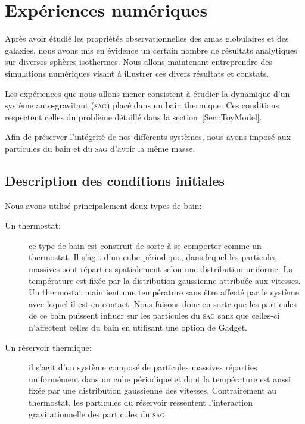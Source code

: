 \chapter{Expériences numériques}\label{Chap::Resultat}
	\minitoc

Après avoir étudié les propriétés observationnelles des amas globulaires et des galaxies, nous avons mis en évidence un certain nombre
de résultats analytiques sur diverses sphères isothermes. Nous allons maintenant entreprendre des simulations numériques visant
à illustrer ces divers résultats et constats.

Les expériences que nous allons mener consistent à étudier la dynamique d'un système auto-gravitant (\textsc{sag}) placé
dans un bain thermique. Ces conditions respectent celles du problème détaillé dans la section~\ref{Sec::ToyModel}.

Afin de préserver l'intégrité de nos différents systèmes, nous avons imposé aux particules du bain et du \textsc{sag} d'avoir la
même masse.

\section{Description des conditions initiales}

	Nous avons utilisé principalement deux types de bain:
	\begin{description}

		\item[Un thermostat:] ce type de bain est construit de sorte à se comporter comme un
			thermostat. Il s'agit d'un cube périodique, dans lequel les particules massives sont
			réparties spatialement selon une distribution uniforme. La température est fixée par la
			distribution gaussienne attribuée aux vitesses. Un thermostat maintient une
			température sans être affecté par le système avec lequel il est en contact.
			Nous faisons donc en sorte que les particules de ce bain puissent influer sur les
			particules du \textsc{sag} sans que celles-ci n'affectent celles du bain en utilisant
			une option de Gadget.

		\item[Un réservoir thermique:] il s'agit d'un système composé de particules massives réparties
			uniformément dans un cube périodique et dont la température est aussi fixée par une
			distribution gaussienne des vitesses. Contrairement au thermostat, les particules du
			réservoir ressentent l'interaction gravitationnelle des particules du \textsc{sag}.

	\end{description}

